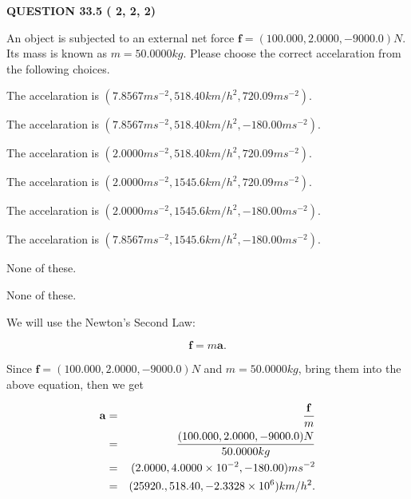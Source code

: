 \documentclass[12pt]{article}
\begin{document}
   
  
\vspace{0.2in}
  
{\textbf{\Large{QUESTION
33.5 
 (          2,          2,          2)
}}}
  
  
 
An object is subjected to an external net force $\mathbf{f}=(
100.000 ,
2.0000,
-9000.0  )N$. Its mass is known as
$m= %
50.0000  kg$. Please choose the correct accelaration
from the following choices.
 
 
 
The accelaration is
$(
7.8567ms^{-2},
518.40km/h^2,
720.09ms^{-2}
).
$
 
 
The accelaration is
$(
7.8567ms^{-2},
518.40km/h^2,
-180.00ms^{-2}
).
$
 
 
The accelaration is
$(
2.0000ms^{-2},
518.40km/h^2,
720.09ms^{-2}
).
$
 
 
The accelaration is
$(
2.0000ms^{-2},
1545.6km/h^2,
720.09ms^{-2}
).
$
 
 
The accelaration is
$(
2.0000ms^{-2},
1545.6km/h^2,
-180.00ms^{-2}
).
$
 
 
The accelaration is
$(
7.8567ms^{-2},
1545.6km/h^2,
-180.00ms^{-2}
).
$
 
 
 None of these.
 
 
\noindent{}
 
 
 None of these.
 
 
\noindent{}
 
 
 
 
 
 
\noindent{}
 
 

We will use the Newton's Second Law:
 
\[
\mathbf{f}=m\mathbf{a}.
\]
 
Since $\mathbf{f}=( %
100.000,  %
2.0000,  %
-9000.0 )N$
and $m= %
50.0000kg$, bring them into the above equation, then we get
 
\begin{eqnarray*}
\mathbf{a}&=&\frac{\mathbf{f}}m  \\
&=&\frac{(
100.000 ,
2.0000 ,
-9000.0 )N
}{ %
50.0000 kg}  \\
&=&(
2.0000 ,
4.0000 \times 10^{-2},
-180.00
)ms^{-2} \\
&=&(
25920. ,
518.40 ,
-2.3328 \times 10^{6}
)km/h^2.
\end{eqnarray*}
 
\end{document}
